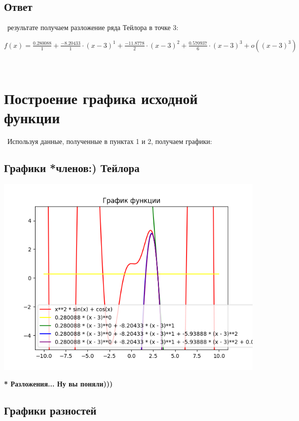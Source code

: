 \documentclass[a4paper,14pt]{extarticle}
\begin{document}
\subsection{Ответ}\  результате получаем разложение ряда Тейлора в точке 3:\begin{center}$f\left(x\right) = \frac{0.280088}{1} + \frac{-8.20433}{1} \cdot{(x - 3)^{1}} + \frac{-11.8778}{2} \cdot{(x - 3)^{2}} + \frac{0.570937}{6} \cdot{(x - 3)^{3}} + o((x - 3)^{3})$ \end{center}\ 


\section{Построение графика исходной функции}\ Используя данные, полученные в пунктах 1 и 2, получаем графики:\
\subsection{Графики *членов:) Тейлора}
\begin{center} \includegraphics[scale=0.6]{plot.png} \end{center}
\textbf{* Разложения... Ну вы поняли)))}\subsection{Графики разностей}
\end{document}
